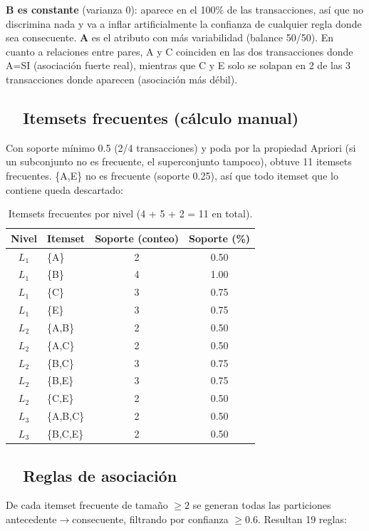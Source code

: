 \documentclass[11pt,a4paper]{article}
\begin{document}
\textbf{B es constante} (varianza 0): aparece en el 100\% de las transacciones, así que no discrimina nada y va a inflar artificialmente la confianza de cualquier regla donde sea consecuente. \textbf{A} es el atributo con más variabilidad (balance 50/50). En cuanto a relaciones entre pares, A y C coinciden en las dos transacciones donde A=SI (asociación fuerte real), mientras que C y E solo se solapan en 2 de las 3 transacciones donde aparecen (asociación más débil).

\subsection{\faLayerGroup\ \ Itemsets frecuentes (cálculo manual)}
Con soporte mínimo 0.5 (2/4 transacciones) y poda por la propiedad Apriori (si un subconjunto no es frecuente, el superconjunto tampoco), obtuve 11 itemsets frecuentes. \{A,E\} no es frecuente (soporte 0.25), así que todo itemset que lo contiene queda descartado:

\begin{table}[H]
\centering
\small
\begin{tabular}{clcc}
\toprule
\textbf{Nivel} & \textbf{Itemset} & \textbf{Soporte (conteo)} & \textbf{Soporte (\%)} \\
\midrule
$L_1$ & \{A\} & 2 & 0.50 \\
$L_1$ & \{B\} & 4 & 1.00 \\
$L_1$ & \{C\} & 3 & 0.75 \\
$L_1$ & \{E\} & 3 & 0.75 \\
$L_2$ & \{A,B\} & 2 & 0.50 \\
$L_2$ & \{A,C\} & 2 & 0.50 \\
$L_2$ & \{B,C\} & 3 & 0.75 \\
$L_2$ & \{B,E\} & 3 & 0.75 \\
$L_2$ & \{C,E\} & 2 & 0.50 \\
$L_3$ & \{A,B,C\} & 2 & 0.50 \\
$L_3$ & \{B,C,E\} & 2 & 0.50 \\
\bottomrule
\end{tabular}
\caption{Itemsets frecuentes por nivel (4 + 5 + 2 = 11 en total).}
\end{table}

\subsection{\faListOl\ \ Reglas de asociación}
De cada itemset frecuente de tamaño $\geq 2$ se generan todas las particiones antecedente$\to$consecuente, filtrando por confianza $\geq 0.6$. Resultan 19 reglas:
\end{document}
